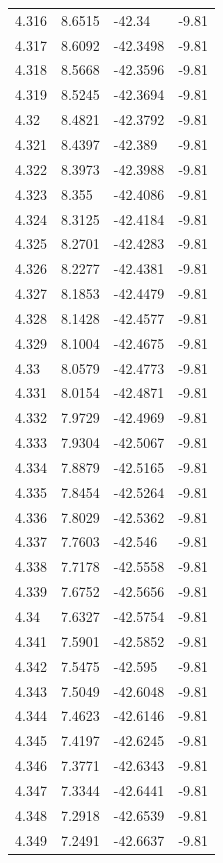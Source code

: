 \begin{tabular}{llll}
4.316 & 8.6515 & -42.34 & -9.81 \\
4.317 & 8.6092 & -42.3498 & -9.81 \\
4.318 & 8.5668 & -42.3596 & -9.81 \\
4.319 & 8.5245 & -42.3694 & -9.81 \\
4.32 & 8.4821 & -42.3792 & -9.81 \\
4.321 & 8.4397 & -42.389 & -9.81 \\
4.322 & 8.3973 & -42.3988 & -9.81 \\
4.323 & 8.355 & -42.4086 & -9.81 \\
4.324 & 8.3125 & -42.4184 & -9.81 \\
4.325 & 8.2701 & -42.4283 & -9.81 \\
4.326 & 8.2277 & -42.4381 & -9.81 \\
4.327 & 8.1853 & -42.4479 & -9.81 \\
4.328 & 8.1428 & -42.4577 & -9.81 \\
4.329 & 8.1004 & -42.4675 & -9.81 \\
4.33 & 8.0579 & -42.4773 & -9.81 \\
4.331 & 8.0154 & -42.4871 & -9.81 \\
4.332 & 7.9729 & -42.4969 & -9.81 \\
4.333 & 7.9304 & -42.5067 & -9.81 \\
4.334 & 7.8879 & -42.5165 & -9.81 \\
4.335 & 7.8454 & -42.5264 & -9.81 \\
4.336 & 7.8029 & -42.5362 & -9.81 \\
4.337 & 7.7603 & -42.546 & -9.81 \\
4.338 & 7.7178 & -42.5558 & -9.81 \\
4.339 & 7.6752 & -42.5656 & -9.81 \\
4.34 & 7.6327 & -42.5754 & -9.81 \\
4.341 & 7.5901 & -42.5852 & -9.81 \\
4.342 & 7.5475 & -42.595 & -9.81 \\
4.343 & 7.5049 & -42.6048 & -9.81 \\
4.344 & 7.4623 & -42.6146 & -9.81 \\
4.345 & 7.4197 & -42.6245 & -9.81 \\
4.346 & 7.3771 & -42.6343 & -9.81 \\
4.347 & 7.3344 & -42.6441 & -9.81 \\
4.348 & 7.2918 & -42.6539 & -9.81 \\
4.349 & 7.2491 & -42.6637 & -9.81 \\

\end{tabular}
